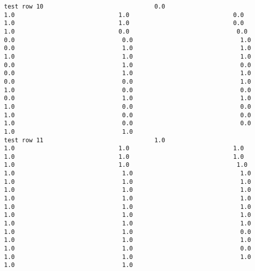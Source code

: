 \documentclass[11pt]{article}
\begin{document}
\begin{verbatim}
test row 10                               0.0                             1.0                             1.0                             0.0                             1.0                             1.0                             0.0                             1.0                             0.0                              0.0                              0.0                              0.0                              1.0                              0.0                              1.0                              1.0                              1.0                              1.0                              1.0                              0.0                              1.0                              0.0                              0.0                              1.0                              1.0                              0.0                              0.0                              1.0                              1.0                              0.0                              0.0                              0.0                              1.0                              1.0                              1.0                              0.0                              0.0                              1.0                              0.0                              0.0                              1.0                              0.0                              0.0                              1.0                              1.0
test row 11                               1.0                             1.0                             1.0                             1.0                             1.0                             1.0                             1.0                             1.0                             1.0                              1.0                              1.0                              1.0                              1.0                              1.0                              1.0                              1.0                              1.0                              1.0                              1.0                              1.0                              1.0                              1.0                              1.0                              1.0                              1.0                              1.0                              1.0                              1.0                              1.0                              1.0                              1.0                              1.0                              1.0                              0.0                              1.0                              1.0                              1.0                              1.0                              1.0                              0.0                              1.0                              1.0                              1.0                              1.0                              1.0

\end{verbatim}
\end{document}
